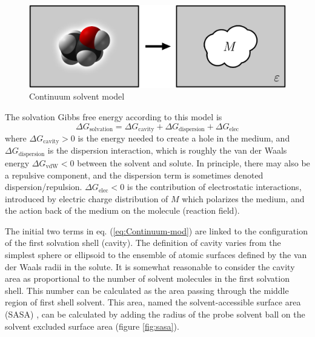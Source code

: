 \begin{figure}[h]
\begin{centering}
\includegraphics[width=0.72\columnwidth]{_figure/reaction-field-model_2}
\par\end{centering}
\caption{Continuum solvent model\label{fig:Reaction-field-model}}
\end{figure}

The solvation Gibbs free energy according to this model is
\begin{equation}
\Delta G_{\mathrm{solvation}}=\Delta G_{\mathrm{cavity}}+\Delta G_{\mathrm{dispersion}}+\Delta G_{\mathrm{elec}}\label{eq:Continuum-mod}
\end{equation}
where $\Delta G_{\mathrm{cavity}}>0$ is the energy needed to create
a hole in the medium, and $\Delta G_{\mathrm{dispersion}}$ is the
dispersion interaction, which is roughly the van der Waals energy
$\Delta G_{\mathrm{vdW}}<0$ between the solvent and solute. In principle,
there may also be a repulsive component, and the dispersion term is
sometimes denoted dispersion/repulsion. $\Delta G_{\mathrm{elec}}<0$
is the contribution of electrostatic interactions, introduced by electric
charge distribution of $M$ which polarizes the medium, and the action
back of the medium on the molecule (reaction field). 

The initial two terms in eq. (\ref{eq:Continuum-mod}) are linked
to the configuration of the first solvation shell (cavity). The definition
of cavity varies from the simplest sphere or ellipsoid to the ensemble
of atomic surfaces defined by the van der Waals radii in the solute.
It is somewhat reasonable to consider the cavity area as proportional
to the number of solvent molecules in the first solvation shell. This
number can be calculated as the area passing through the middle region
of first shell solvent. This area, named the solvent-accessible surface
area (SASA) \citep{SAS_1,SAS_2}, can be calculated by adding the
radius of the probe solvent ball on the solvent excluded surface area
(figure \ref{fig:sasa}).

